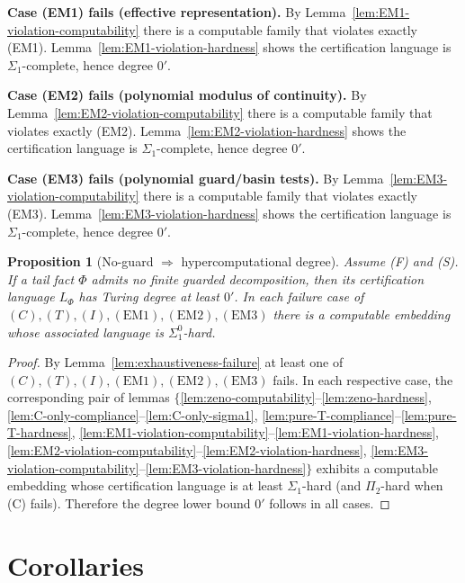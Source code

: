 \documentclass[12pt]{article}
\theoremstyle{definition}
\theoremstyle{plain}
\newtheorem{proposition}{Proposition}[section]
\begin{document}
\medskip
\noindent\textbf{Case (EM1) fails (effective representation).}
By Lemma~\ref{lem:EM1-violation-computability} there is a computable family
that violates exactly (EM1).  Lemma~\ref{lem:EM1-violation-hardness} shows the
certification language is \(\Sigma_1\)-complete, hence degree \(0'\).

\medskip
\noindent\textbf{Case (EM2) fails (polynomial modulus of continuity).}
By Lemma~\ref{lem:EM2-violation-computability} there is a computable family
that violates exactly (EM2).  Lemma~\ref{lem:EM2-violation-hardness} shows the
certification language is \(\Sigma_1\)-complete, hence degree \(0'\).

\medskip
\noindent\textbf{Case (EM3) fails (polynomial guard/basin tests).}
By Lemma~\ref{lem:EM3-violation-computability} there is a computable family
that violates exactly (EM3).  Lemma~\ref{lem:EM3-violation-hardness} shows the
certification language is \(\Sigma_1\)-complete, hence degree \(0'\).

\begin{proposition}[No-guard $\Rightarrow$ hypercomputational degree]
\label{prop:no-guard-to-degree}
Assume (F) and (S). If a tail fact $\Phi$ admits no finite guarded
decomposition, then its certification language $L_\Phi$ has Turing
degree at least $0'$. In each failure case of
$(C),(T),(I),(\mathrm{EM1}),(\mathrm{EM2}),(\mathrm{EM3})$ there is a
computable embedding whose associated language is $\Sigma^0_1$-hard.
\end{proposition}


\begin{proof}
By Lemma~\ref{lem:exhaustiveness-failure} at least one of
\((C),(T),(I),(\mathrm{EM1}),(\mathrm{EM2}),(\mathrm{EM3})\) fails.  In each
respective case, the corresponding pair of lemmas
\(\{\)\ref{lem:zeno‐computability}–\ref{lem:zeno‐hardness},
\ref{lem:C-only-compliance}–\ref{lem:C-only-sigma1},
\ref{lem:pure-T-compliance}–\ref{lem:pure-T-hardness},
\ref{lem:EM1-violation-computability}–\ref{lem:EM1-violation-hardness},
\ref{lem:EM2-violation-computability}–\ref{lem:EM2-violation-hardness},
\ref{lem:EM3-violation-computability}–\ref{lem:EM3-violation-hardness}\(\}\)
exhibits a computable embedding whose certification language is at least
\(\Sigma_1\)-hard (and \(\Pi_2\)-hard when (C) fails).  Therefore the degree
lower bound \(0'\) follows in all cases.
\end{proof}


\section{Corollaries}
\end{document}
